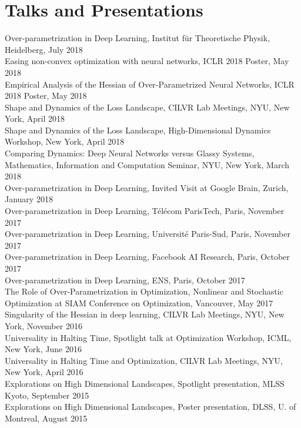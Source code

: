 \documentclass[10pt,letterpaper]{article}
\renewenvironment{itemize}
{
\begin{list}{}{\setlength{\leftmargin}{1.5em}}
}
{
  \end{list}
}
\begin{document}
\section*{Talks and Presentations}
\begin{itemize}
\item Over-parametrization in Deep Learning, Institut f\"ur Theoretische Physik, Heidelberg, July 2018 \\
Easing non-convex optimization with neural networks, ICLR 2018 Poster, May 2018 \\
Empirical Analysis of the Hessian of Over-Parametrized Neural Networks, ICLR 2018 Poster, May 2018 \\
Shape and Dynamics of the Loss Landscape, CILVR Lab Meetings, NYU, New York, April 2018 \\
Shape and Dynamics of the Loss Landscape, High-Dimensional Dynamics Workshop, New York, April 2018 \\
Comparing Dynamics: Deep Neural Networks versus Glassy Systems, Mathematics, Information and Computation Seminar, NYU, New York, March 2018 \\ 
Over-parametrization in Deep Learning, Invited Visit at Google Brain, Zurich, January 2018 \\ 
Over-parametrization in Deep Learning, T\'el\'ecom ParisTech, Paris, November 2017 \\ 
Over-parametrization in Deep Learning, Universit\'e Paris-Sud, Paris, November 2017 \\ 
Over-parametrization in Deep Learning, Facebook AI Research, Paris, October 2017 \\ 
Over-parametrization in Deep Learning, ENS, Paris, October 2017 \\ 
The Role of Over-Parametrization in Optimization, Nonlinear and Stochastic Optimization at SIAM Conference on Optimization, Vancouver, May 2017 \\ 
Singularity of the Hessian in deep learning, CILVR Lab Meetings, NYU, New York, November 2016 \\ 
Universality in Halting Time, Spotlight talk at Optimization Workshop, ICML, New York, June 2016 \\ 
Universality in Halting Time and Optimization, CILVR Lab Meetings, NYU, New York, April 2016 \\ 
Explorations on High Dimensional Landscapes, Spotlight presentation, MLSS Kyoto, September 2015 \\ 
Explorations on High Dimensional Landscapes, Poster presentation, DLSS, U. of Montreal, August 2015 \\ 

\end{itemize}
\end{document}
